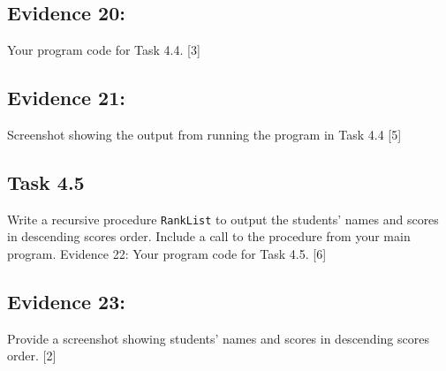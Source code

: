 \subsection*{Evidence 20: }

Your program code for Task 4.4. \hfill{}{[}3{]}

\subsection*{Evidence 21:}

Screenshot showing the output from running the program in Task 4.4
\hfill{}{[}5{]}

\subsection*{Task 4.5 }

Write a recursive procedure \texttt{RankList} to output the students\textquoteright{}
names and scores in descending scores order. Include a call to the
procedure from your main program. Evidence 22: Your program code for
Task 4.5. {[}6{]} 

\subsection*{Evidence 23: }

Provide a screenshot showing students\textquoteright{} names and scores
in descending scores order. \hfill{} {[}2{]}